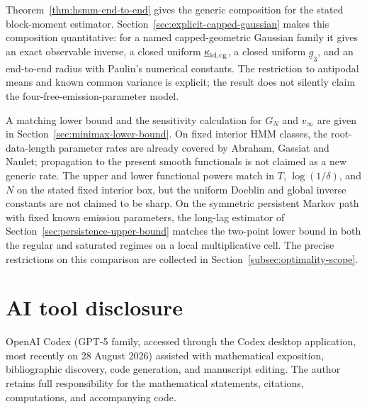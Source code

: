 \documentclass[11pt]{article}
\theoremstyle{definition}
\theoremstyle{remark}
\begin{document}
Theorem~\ref{thm:hsmm-end-to-end} gives the generic composition for the stated
block-moment estimator.  Section~\ref{sec:explicit-capped-gaussian} makes this
composition quantitative:
for a named capped-geometric Gaussian family it gives an exact observable
inverse, a closed uniform $\underline\kappa_{\rm id,cg}$, a closed uniform
$\underline g_3$, and an end-to-end radius with Paulin's numerical constants.
The restriction to antipodal means and known common variance is explicit; the
result does not silently claim the four-free-emission-parameter model.

A matching lower bound and the sensitivity calculation for $G_N$ and
$v_\infty$ are given in Section~\ref{sec:minimax-lower-bound}.  On fixed
interior HMM classes, the root-data-length parameter rates are already covered
by Abraham, Gassiat and Naulet; propagation to the present smooth functionals
is not claimed as a new generic rate.  The upper and lower functional powers
match in $T$, $\log(1/\delta)$, and $N$ on the stated fixed interior box, but
the uniform Doeblin and global inverse constants are not claimed to be sharp.
On the symmetric persistent Markov path with fixed known emission
parameters, the long-lag estimator of
Section~\ref{sec:persistence-upper-bound} matches the two-point lower bound in
both the regular and saturated regimes on a local multiplicative cell.
The precise restrictions on this comparison are collected in
Section~\ref{subsec:optimality-scope}.

\section*{AI tool disclosure}

OpenAI Codex (GPT-5 family, accessed through the Codex desktop application,
most recently on 28 August 2026) assisted with mathematical exposition,
bibliographic discovery, code generation, and manuscript editing.  The author
retains full responsibility for the mathematical statements, citations,
computations, and accompanying code.
\end{document}
